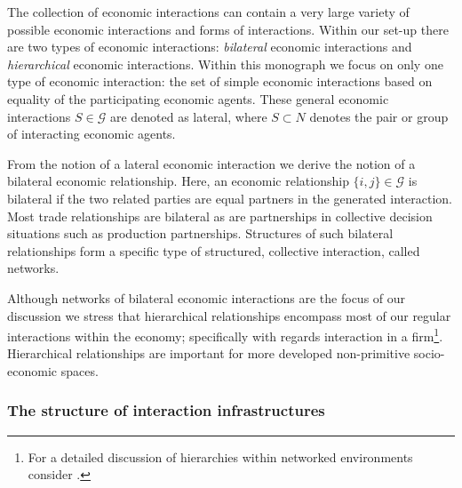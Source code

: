 The collection of economic interactions can contain a very large variety of possible economic interactions and forms of interactions. Within our set-up there are two types of economic interactions: \emph{bilateral} economic interactions and \emph{hierarchical} economic interactions. Within this monograph we focus on only one type of economic interaction: the set of simple economic interactions based on equality of the participating economic agents. These general economic interactions $S \in \mathcal{G}$ are denoted as lateral, where $S \subset N$ denotes the pair or group of interacting economic agents.

From the notion of a lateral economic interaction we derive the notion of a bilateral economic relationship. Here, an economic relationship $\{i, j\} \in \mathcal{G}$ is bilateral if the two related parties are equal partners in the generated interaction. Most trade relationships are bilateral as are partnerships in collective decision situations such as production partnerships. Structures of such bilateral relationships form a specific type of structured, collective interaction, called networks.

Although networks of bilateral economic interactions are the focus of our discussion we stress that hierarchical relationships encompass most of our regular interactions within the economy; specifically with regards interaction in a firm\footnote{For a detailed discussion of hierarchies within networked environments consider \citet{Gilles2010}.}. Hierarchical relationships are important for more developed non-primitive socio-economic spaces.

\subsubsection{The structure of interaction infrastructures}

